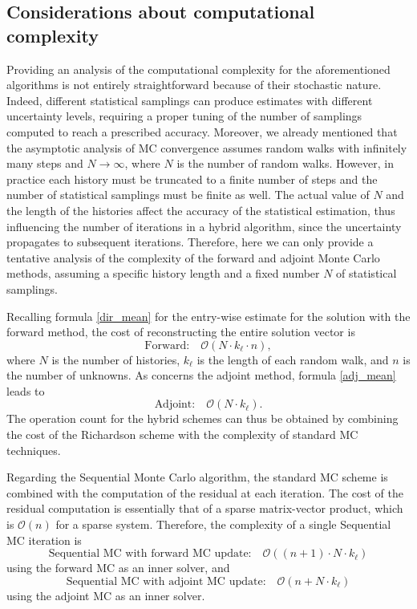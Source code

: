 \documentclass[times]{nlaauth}
\begin{document}
\subsection{Considerations about computational complexity} \label{sec:complex}

Providing an analysis of the computational complexity for the aforementioned algorithms is not entirely
straightforward because of their stochastic nature. Indeed, different statistical samplings can produce estimates with
different uncertainty levels, requiring a proper tuning of the number of samplings computed to reach a prescribed accuracy.
Moreover, we already mentioned that the asymptotic analysis of MC convergence assumes random walks with infinitely many steps
and $N\rightarrow \infty$, where $N$ is the number of random walks. However, in practice each history must be truncated to a
finite number of steps and the number of statistical samplings must be finite as well. The actual value of $N$ and the length
of the histories affect the accuracy of the statistical estimation, thus influencing the number of iterations in a hybrid algorithm,
since the uncertainty propagates to subsequent iterations.
Therefore, here  we can only provide a tentative analysis of the complexity of the forward and adjoint Monte Carlo
methods, assuming a specific history length and a fixed number $N$ of statistical samplings.

Recalling formula \eqref{dir_mean} for the entry-wise estimate for the solution with the forward method, the cost of
reconstructing the entire solution vector is
\begin{equation}
\text{Forward:}\quad \mathcal{O}(N\cdot k_{\ell}\cdot n),
\label{for_cost}
\end{equation}
where $N$ is the number of histories, $k_{\ell}$ is the length of each random walk, and $n$ is the number of unknowns.
As concerns the adjoint method, formula \eqref{adj_mean} leads to
\begin{equation}
\text{Adjoint:}\quad \mathcal{O}(N\cdot k_{\ell}).
\label{adj_cost}
\end{equation}
The operation count for the hybrid schemes can thus be obtained by combining the cost of the Richardson scheme with the
complexity of standard MC techniques.

Regarding the Sequential Monte Carlo algorithm, the standard MC scheme is combined with the computation of the residual
at each iteration. The cost of the residual computation is essentially that of a sparse matrix-vector product, which is
$\mathcal{O}(n)$ for a sparse system. Therefore, the complexity of a single Sequential MC iteration is
\begin{equation}
\text{Sequential MC with forward MC update:}\quad \mathcal{O}((n + 1) \cdot N\cdot k_{\ell})
\label{seqfor_cost}
\end{equation}
using the forward MC as an inner solver, and
\begin{equation}
\text{Sequential MC with adjoint MC update:}\quad \mathcal{O}(n + N\cdot k_{\ell})
\label{seqadj_cost}
\end{equation}
using the adjoint MC as an inner solver.
\end{document}
